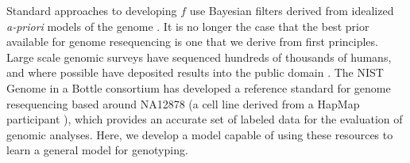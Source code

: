 \documentclass{article}
\begin{document}

Standard approaches to developing $f$ use Bayesian filters derived from idealized \emph{a-priori} models of the genome  \cite{samtools, gatk2011, garrison2012haplotype, rimmer2014integrating, li2011stats}.
It is no longer the case that the best prior available for genome resequencing is one that we derive from first principles. 
Large scale genomic surveys have sequenced hundreds of thousands of humans, and where possible have deposited results into the public domain \cite{1000Gphase1, 1000g2015, exac2015, cavalli2005human, uk10k2015uk10k}.
The NIST Genome in a Bottle consortium \cite{zook2014integrating} has developed a reference standard for genome resequencing based around NA12878 (a cell line derived from a HapMap participant \cite{gibbs2003international}), which provides an accurate set of labeled data for the evaluation of genomic analyses.
Here, we develop a model capable of using these resources to learn a general model for genotyping.


\end{document}
